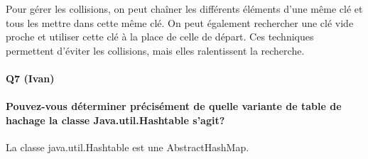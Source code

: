 \documentclass[a4paper]{article}
\begin{document}
Pour gérer les collisions, on peut chaîner les différents éléments d'une même clé et tous les mettre dans cette même clé.
On peut également rechercher une clé vide proche et utiliser cette clé à la place de celle de départ. Ces techniques permettent d'éviter les collisions, mais elles ralentissent la recherche.

\paragraph{Q7 (Ivan)}

\paragraph*{Pouvez-vous déterminer précisément de quelle variante de table de hachage la classe Java.util.Hashtable s'agit?}

La classe java.util.Hashtable est une AbstractHashMap. 
\end{document}
